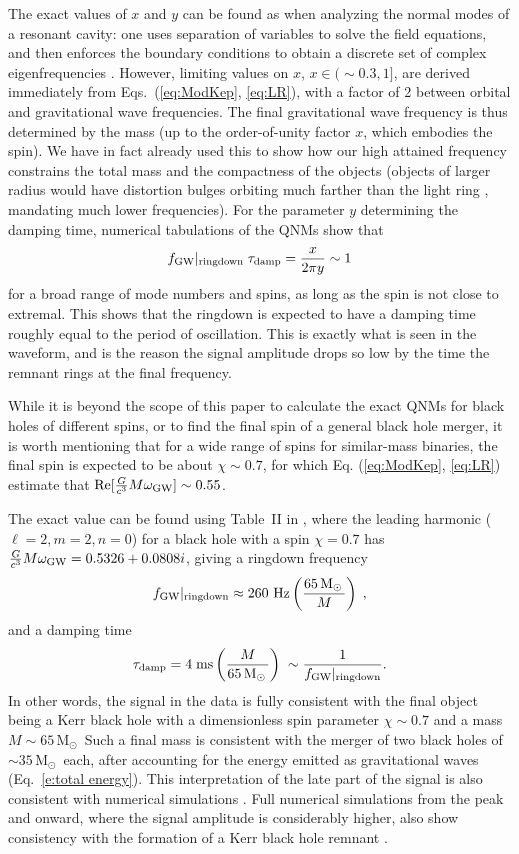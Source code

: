 \documentclass{andp2012}%
\def\w{\omega}
\newcommand{\inlinecite}[1]{\cite{#1}}
\newcommand{\refeqn}[1]{Eq.\ \ref{#1}}
\def\fgw{f_{\rm GW}}
\def\wgw{\w_{\rm GW}}
\def\subRD{|_{\rm ringdown}}
\def\fRD{{\fgw}\subRD}
\def\BH{black hole }		\def\BHs{black holes }			\def\BHns{black hole}		\def\BHsns{black holes}		\def\GW{gravitational wave }		\def\GWs{gravitational waves }				\def\GWns{gravitational wave}		\def\GWsns{gravitational waves}		\def\LR{light ring }		\def\ISCO{innermost stable circular orbit }		\def\NS{neutron star }		\def\NSs{neutron stars }		\def\GR{general relativity }
\newcommand{\Msun}{\ensuremath{\mathrm{M}_\odot\,}}
\newcommand{\MCOMPONENTAPPROX}{\ensuremath{35\, \Msun}}
\begin{document}
The exact values of $x$ and $y$ can be found as when analyzing the normal
modes of a resonant cavity: one uses separation of variables to solve the field
equations, and then enforces the boundary conditions to obtain
a discrete set of complex eigenfrequencies \cite{BertiCardosoWill}.
However, limiting values on $x$, $x \in (\sim0.3,1]$, are derived immediately
from Eqs.\ (\ref{eq:ModKep}, \ref{eq:LR}),
with a factor of 2 between orbital and \GW frequencies.
The final \GW frequency is thus determined by the mass
(up to the order-of-unity factor $x$, which embodies the spin).
We have in fact already used this to show
how our high attained frequency constrains the total mass
and the compactness of the objects
(objects of larger radius would have distortion bulges orbiting much farther than the \LR,
mandating much lower frequencies).
For the parameter $y$ determining the damping time, numerical tabulations
of the QNMs \cite{BertiCardosoWill} show that
\begin{equation}
\fRD \; \tau_{\rm damp} = \frac{x}{2 \pi y } \sim 1 
\end{equation}
for a broad range of mode numbers and spins,
as long as the spin is not close to extremal.
This shows that the ringdown is expected to have a damping time
roughly equal to the period of oscillation. This is exactly what is
seen in the waveform, and is the reason the signal amplitude drops so low
by the time the remnant rings at the final frequency.

While it is beyond the scope of this paper to calculate the exact QNMs for \BHs of different spins,
or to find the final spin of a general \BH merger,
it is worth mentioning that for a wide range of spins for similar-mass binaries,
the final spin is expected to be about $\chi\sim0.7$,
for which Eq. (\ref{eq:ModKep}, \ref{eq:LR}) estimate that
${\rm Re} [ \frac{G}{c^3} M \wgw ] \sim 0.55$.

The exact value can be found using Table~II in \inlinecite{BertiCardosoWill},
where the leading harmonic ($\ell=2,m=2,n=0$)
for a \BH with a spin $\chi=0.7$ has
$\frac{G}{c^3}M\wgw = 0.5326 + 0.0808 i $,
giving a ringdown frequency
\begin{equation}
\fRD \approx 260~{\rm Hz}
\left ( \frac{65\,\Msun}{M} \right )  \; ,
\end{equation}
and a damping time
\begin{equation}
\tau_{\rm damp} =  4 \; {\rm ms} 
\left ( \frac{M}{65\,\Msun} \right )   \; \sim
\frac{1}{\fRD} .
\end{equation}
In other words, the signal in the data is fully consistent\cite{Burko:2016vnu} with
the final object being a Kerr black hole with a dimensionless spin
parameter $\chi \sim 0.7$ and a mass $M\sim 65\,\Msun{}$
Such a final mass is consistent with the merger of two \BHs
of $\sim\MCOMPONENTAPPROX$ each,
after accounting for the energy emitted as \GWs (\refeqn{e:total energy}).
This interpretation of the late part of the signal
is also consistent with numerical simulations \cite{PhysRevD.85.024018}.
Full numerical simulations from the peak and onward,
where the signal amplitude is considerably higher, also show
consistency with the formation of a Kerr \BH remnant \cite{TestingGRPaper, PEPaper}.
\end{document}

